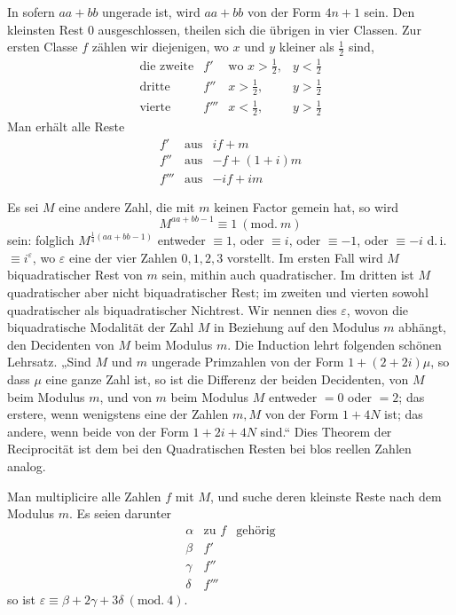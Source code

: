 In sofern $aa+bb$ ungerade ist, wird $aa+bb$ von der Form $4n+1$ sein. Den kleinsten Rest $0$ ausgeschlossen, theilen sich die übrigen in vier Classen. Zur ersten Classe $f$ zählen wir diejenigen, wo $x$ und $y$ kleiner als $\frac12$ sind,
%
\[
\begin{array}{lcll}
\text{die zweite}&f'&\text{wo }x>\tfrac12,&y<\tfrac12\\
\text{dritte}&f''&x>\tfrac12,&y>\tfrac12\\
\text{vierte}&f'''&x<\tfrac12,&y>\tfrac12
\end{array}
\]
Man erhält alle Reste
\[
\begin{array}{rcl}
f'&\text{aus}&if+m\\
f''&\text{aus}&-f+(1+i)m\\
f'''&\text{aus}&-if+im
\end{array}
\]

Es sei $M$ eine andere Zahl, die mit $m$ keinen Factor gemein hat, so wird
\[
M^{aa+bb-1}\equiv1\ (\mathrm{mod.}\ m)
\]
sein: folglich $M^{\frac14(aa+bb-1)}$ entweder $\equiv1$, oder $\equiv i$, oder $\equiv-1$, oder $\equiv-i$ d.\,i. $\equiv i^{\varepsilon}$, wo $\varepsilon$ eine der vier Zahlen $0,1,2,3$ vorstellt. Im ersten Fall wird $M$ biquadratischer Rest von $m$ sein, mithin auch quadratischer. Im dritten ist $M$ quadratischer aber nicht biquadratischer Rest; im zweiten und vierten sowohl quadratischer als biquadratischer Nichtrest. Wir nennen dies $\varepsilon$, wovon die biquadratische Modalität der Zahl $M$ in Beziehung auf den Modulus $m$ abhängt, den Decidenten von $M$ beim Modulus $m$. Die Induction lehrt folgenden schönen Lehrsatz. „Sind $M$ und $m$ ungerade Primzahlen von der Form $1+(2+2i)\mu$, so dass $\mu$ eine ganze Zahl ist, so ist die Differenz der beiden Decidenten, von $M$ beim Modulus $m$, und von $m$ beim Modulus $M$ entweder $=0$ oder $=2$; das erstere, wenn wenigstens eine der Zahlen $m,M$ von der Form $1+4N$ ist; das andere, wenn beide von der Form $1+2i+4N$ sind.“ Dies Theorem der Reciprocität ist dem bei den Quadratischen Resten bei blos reellen Zahlen analog.

Man multiplicire alle Zahlen $f$ mit $M$, und suche deren kleinste Reste nach dem Modulus $m$. Es seien darunter
\[
\begin{array}{cll}
\alpha&\text{zu }f&\text{gehörig}\\
\beta&f'&\\
\gamma&f''&\\
\delta&f'''&
\end{array}
\]
so ist $\varepsilon\equiv\beta+2\gamma+3\delta\ (\mathrm{mod.}\ 4)$.


